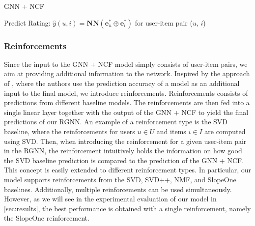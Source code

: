 \begin{algorithm}
    \caption{GNN + NCF} \label{alg:gnn_ncf}
    
    \SetAlgoLined
    \DontPrintSemicolon
    
        
    Predict Rating: $\hat{y}(u,i) = \textbf{NN}\left( \textbf{e}^{*}_u\oplus\textbf{e}^{*}_i\right)$ for user-item pair ($u$, $i$) \;
\end{algorithm}

\subsubsection{Reinforcements}\label{reinforcements} Since the input to the GNN + NCF model simply consists of user-item pairs, we aim at providing additional information to the network. Inspired by the approach of \citet{reliability}, where the authors use the prediction accuracy of a model as an additional input to the final model, we introduce reinforcements. Reinforcements consists of predictions from different baseline models. The reinforcements are then fed into a single linear layer together with the output of the GNN + NCF to yield the final predictions of our RGNN. An example of a reinforcement type is the SVD baseline, where the reinforcements for users $u \in U$ and items $i \in I$ are computed using SVD. Then, when introducing the reinforcement for a given user-item pair in the RGNN, the reinforcement intuitively holds the information on how good the SVD baseline prediction is compared to the prediction of the GNN + NCF. This concept is easily extended to different reinforcement types. In particular, our model supports reinforcements from the SVD, SVD++, NMF, and SlopeOne baselines. Additionally, multiple reinforcements can be used simultaneously. However, as we will see in the experimental evaluation of our model in \autoref{sec:results}, the best performance is obtained with a single reinforcement, namely the SlopeOne reinforcement.

